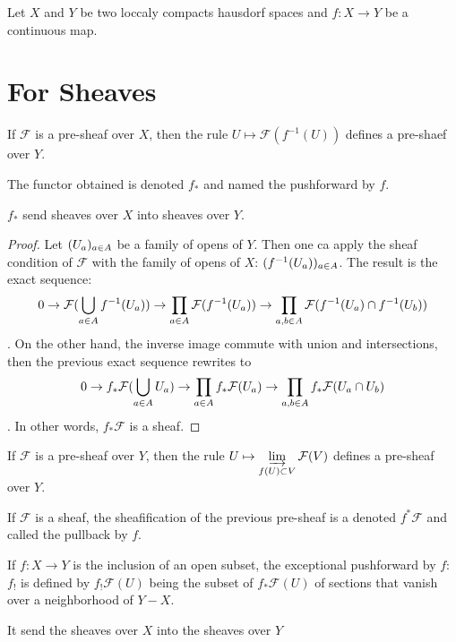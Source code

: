 Let $X$ and $Y$ be two loccaly compacts hausdorf spaces and $f:X\to Y$ be a continuous map.

\section{For Sheaves}

\begin{definition}\label{def:pushforward_of_sheaf}
    If $\mathcal{F}$ is a pre-sheaf over $X$, then the rule $U\mapsto \mathcal{F}(f^{-1}(U))$ defines a pre-shaef over $Y$.

    The functor obtained is denoted $f_*$ and named the pushforward by $f$.

    $f_*$ send sheaves over $X$ into sheaves over $Y$.
\end{definition}

\begin{proof}
    Let $(U_a)_{a\in A}$ be a family of opens of $Y$. Then one ca apply the sheaf condition of $\mathcal{F}$ with the family of opens of $X$: $(f^{-1}(U_a))_{a\in A}$. The result is the exact sequence: $$0\to \mathcal{F}(\bigcup\limits_{a\in A}f^{-1}(U_a))\to \prod\limits_{a\in A}\mathcal{F}(f^{-1}(U_a))\to \prod\limits_{a,b\in A}\mathcal{F}(f^{-1}(U_a)\cap f^{-1}(U_b))$$. 
    On the other hand, the inverse image commute with union and intersections, then the previous exact sequence rewrites to $$0\to f_*\mathcal{F}(\bigcup\limits_{a\in A}U_a)\to \prod\limits_{a\in A}f_*\mathcal{F}(U_a)\to \prod\limits_{a,b\in A}f_*\mathcal{F}(U_a\cap U_b)$$. 
    In other words, $f_*\mathcal{F}$ is a sheaf.
\end{proof}

\begin{definition}\label{def:pullback_of_sheaf}
    If $\mathcal{F}$ is a pre-sheaf over $Y$, then the rule $U\mapsto \varinjlim\limits_{f(U)\subset V}\mathcal{F}(V)$ defines a pre-sheaf over $Y$.

    If $\mathcal{F}$ is a sheaf, the sheafification of the previous pre-sheaf is a denoted $f^*\mathcal{F}$ and called the pullback by $f$.

\end{definition}

\begin{definition}\label{def:exceptional_pushforward_of_sheaf}
    If $f:X\to Y$ is the inclusion of an open subset, the exceptional pushforward by $f$: $f_!$ is defined by $f_!\mathcal{F}(U)$ being the subset of $f_*\mathcal{F}(U)$ of sections that vanish over a neighborhood of $Y-X$.

    It send the sheaves over $X$ into the sheaves over $Y$
\end{definition}

